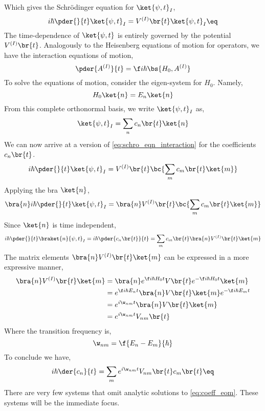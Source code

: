 \documentclass{article}
\begin{document}
Which gives the Schrödinger equation for $\ket{\psi, t}_I$,
\[ i \hbar \pder{}{t} \ket{\psi, t}_I = V^{(I)}\br{t} \ket{\psi, t}_I \eq \label{eq:schro_eqn_interaction} \]
The time-dependence of $\ket{\psi, t}$ is entirely governed by the potential $V^{(I)}\br{t}$. Analogously to the Heisenberg equations of motion for operators, we have the interaction equations of motion,
\[ \pder{A^{(I)}}{t} = \f i \hbar \bs{H_0, A^{(I)}} \]
To solve the equations of motion, consider the eigen-system for $H_0$. Namely,
\[ H_0 \ket{n} =E_n \ket{n} \]
From this complete orthonormal basis, we write $\ket{\psi, t}_I$ as,
\[ \ket{\psi ,t}_I = \sum_{n} c_n\br{t} \ket{n} \]
We can now arrive at a version of \cref{eq:schro_eqn_interaction} for the coefficients $c_n\br{t}$.
\[ i \hbar \pder{}{t} \ket{\psi, t}_I = V^{(I)}\br{t} \bc{\sum_{m} c_m\br{t} \ket{m}}\]
Applying the bra $\ket{n}$,
\[ \bra{n} i \hbar \pder{}{t} \ket{\psi, t}_I = \bra{n} V^{(I)}\br{t} \bc{\sum_{m} c_m\br{t} \ket{m}}\]
Since $\ket{n}$ is time independent,
\[ i \hbar \pder{}{t} \braket{n}{\psi, t}_I = i \hbar \pder{c_n\br{t}}{t}  = \sum_{m} c_m\br{t} \bra{n} V^{(I)}\br{t} \ket{m} \]
The matrix elements $\bra{n} V^{(I)}\br{t} \ket{m}$ can be expressed in a more expressive manner,
\begin{align*}
\bra{n} V^{(I)}\br{t} \ket{m}
&= \bra{n}  e^{\f i \hbar H_0 t} V\br{t} e^{-\f i \hbar H_0 t} \ket{m} \\
&=   e^{\f i \hbar E_n t} \bra{n} V\br{t} \ket{m} e^{-\f i \hbar E_m t}  \\
&=   e^{i \w_{nm} t} \bra{n} V\br{t} \ket{m} \\
&=   e^{i \w_{nm} t} V_{nm}\br{t}
\end{align*}
Where the transition frequency is,
\[ \w_{nm} = \f{E_n - E_m}{\hbar} \]
To conclude we have,
\[ i\hbar \der{c_n}{t} = \sum_m e^{i \w_{nm} t} V_{nm}\br{t} c_m\br{t} \eq\label{eq:coeff_eom}\]
There are very few systems that omit analytic solutions to \cref{eq:coeff_eom}. These systems will be the immediate focus.
\end{document}
